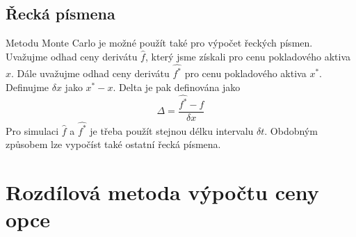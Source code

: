 \documentclass[a4paper]{book}
\begin{document}
\subsection{Řecká písmena}

Metodu Monte Carlo je možné použít také pro výpočet řeckých písmen. Uvažujme odhad ceny derivátu $\hat{f}$, který jsme získali pro cenu pokladového aktiva $x$. Dále uvažujme odhad ceny derivátu $\hat{f^*}$ pro cenu pokladového aktiva $x^*$. Definujme $\delta x$ jako $x^* - x$. Delta je pak definována jako
\begin{equation*}
\Delta = \frac{\hat{f^*}-\hat{f}}{\delta x}
\end{equation*}
Pro simulaci $\hat{f}$ a $\hat{f^*}$ je třeba použít stejnou délku intervalu $\delta t$. Obdobným způsobem lze vypočíst také ostatní řecká písmena.

\section{Rozdílová metoda výpočtu ceny opce}
\end{document}
